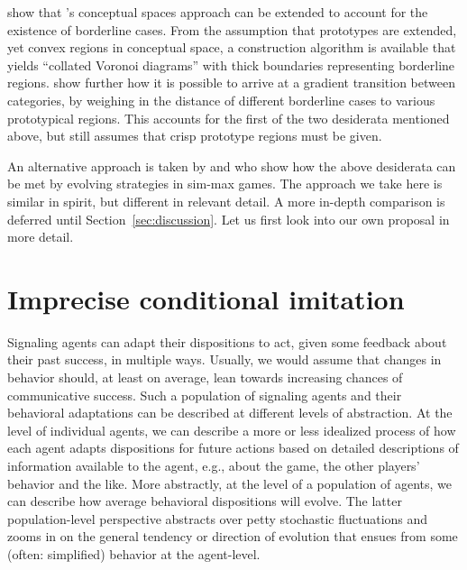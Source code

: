 \documentclass[fleqn,reqno,10pt]{article}
\begin{document}
\citet{DouvenDecock2011:Vagueness:-A-Co} show that
\citeauthor{Gardenfors2000:Conceptual-Spac}'s conceptual spaces
approach can be extended to account for the existence of borderline
cases. From the assumption that prototypes are extended, yet convex
regions in conceptual space, a construction algorithm is available
that yields ``collated Voronoi diagrams'' with thick boundaries
representing borderline
regions. \citet{DecockDouven2012:What-is-Graded-} show further how it
is possible to arrive at a gradient transition between categories, by
weighing in the distance of different borderline cases to various
prototypical regions. This accounts for the first of the two
desiderata mentioned above, but still assumes that crisp prototype
regions must be given.

An alternative approach is taken by \citet{FrankeJager2010:Vagueness-Signa} and
\citet{OConnor2013:The-Evolution-o} who show how the above desiderata can be met by evolving
strategies in sim-max games. The approach we take here is similar in spirit, but different in
relevant detail. A more in-depth comparison is deferred until Section~\ref{sec:discussion}. Let
us first look into our own proposal in more detail.



\section{Imprecise conditional imitation}
\label{sec:repl-diff-dynam}

Signaling agents can adapt their dispositions to act, given some feedback about their past
success, in multiple ways. Usually, we would assume that changes in behavior should, at least
on average, lean towards increasing chances of communicative success. Such a population
of signaling agents and their behavioral adaptations can be described at different levels of
abstraction. At the level of individual agents, we can describe a more or less idealized
process of how each agent adapts dispositions for future actions based on detailed descriptions
of information available to the agent, e.g., about the game, the other players' behavior and
the like. More abstractly, at the level of a population of agents, we can describe how
average behavioral dispositions will evolve. The latter population-level perspective abstracts
over petty stochastic fluctuations and zooms in on the general tendency or direction of
evolution that ensues from some (often: simplified) behavior at the agent-level.
\end{document}
